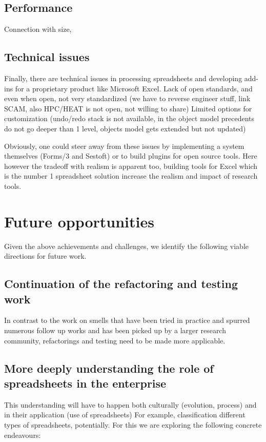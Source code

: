 \documentclass[conference]{IEEEtran}
\begin{document}
\subsection{Performance}
Connection with size, 

\subsection{Technical issues}
Finally, there are technical issues in processing spreadsheets and developing add-ins for a proprietary product like Microsoft Excel. 
Lack of open standards, and even when open, not very standardized (we have to reverse engineer stuff, link SCAM, also HPC/HEAT is not open, not willing to share)
Limited options for customization (undo/redo stack is not available, in the object model precedents do not go deeper than 1 level, objects model gets extended but not updated)

Obviously, one could steer away from these issues by implementing a system themselves (Forms/3 and Sestoft) or to build plugins for open source tools. Here however the tradeoff with realism is apparent too, building tools for Excel which is the number 1 spreadsheet solution increase the realism and impact of research tools.

\section{Future opportunities}
Given the above achievements  and challenges, we identify the following viable directions for future work.

\subsection{Continuation of the refactoring and testing work}
In contrast to the work on smells that have been tried in practice and spurred numerous follow up works and has been picked up by a larger research community, refactorings and testing need to be made more applicable.

\subsection{More deeply understanding the role of spreadsheets in the enterprise}
This understanding will have to happen both culturally (evolution, process) and in their application (use of spreadsheets) For example, classification different types of spreadsheets, potentially. For this we are exploring the following concrete endeavours:
\end{document}
